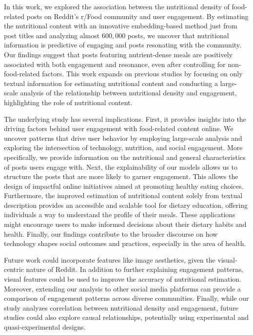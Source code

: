 In this work, we explored the association between the nutritional density of food-related posts on Reddit's r/Food community and user engagement.
By estimating the nutritional content with an innovative embedding-based method just from post titles and analyzing almost $600,000$ posts, we uncover that nutritional information is predictive of engaging and posts resonating with the community.
Our findings suggest that posts featuring nutrient-dense meals are positively associated with both engagement and resonance, even after controlling for non-food-related factors.
This work expands on previous studies by focusing on only textual information for estimating nutritional content and conducting a large-scale analysis of the relationship between nutritional density and engagement, highlighting the role of nutritional content.

The underlying study has several implications.
First, it provides insights into the driving factors behind user engagement with food-related content online. We uncover patterns that drive user behavior by employing large-scale analysis and exploring the intersection of technology, nutrition, and social engagement. More specifically, we provide information on the nutritional and general characteristics of posts users engage with.
Next, the explainability of our models allows us to structure the posts that are more likely to garner engagement. This allows the design of impactful online initiatives aimed at promoting healthy eating choices.
Furthermore, the improved estimation of nutritional content solely from textual description provides an accessible and scalable tool for dietary education, offering individuals a way to understand the profile of their meals.
These applications might encourage users to make informed decisions about their dietary habits and health.
Finally, our findings contribute to the broader discourse on how technology shapes social outcomes and practices, especially in the area of health.

Future work could incorporate features like image aesthetics, given the visual-centric nature of Reddit. In addition to further explaining engagement patterns, visual features could be used to improve the accuracy of nutritional estimation.
Moreover, extending our analysis to other social media platforms can provide a comparison of engagement patterns across diverse communities.
Finally, while our study analyzes correlation between nutritional density and engagement, future studies could also explore causal relationships, potentially using experimental and quasi-experimental designs.